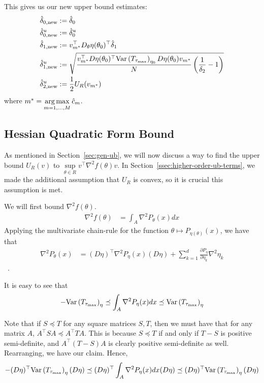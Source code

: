 \documentclass[10pt]{article}
\newcommand{\new}{\operatorname{new}}
\begin{document}
This gives us our new upper bound estimates:
\begin{align*}
    \hat{\delta}_{0, \new} &:= \hat{\delta}_0 \\
    \hat{\delta}_{0, \new}^u &:= \hat{\delta}_0^u \\
    \hat{\delta}_{1, \new} &:= v_{m^*}^\top D_\theta \eta(\theta_0)^\top \hat{\delta}_1 \\
    \hat{\delta}_{1, \new}^u &:= \sqrt{%
        \frac{v_{m^*}^\top D\eta(\theta_0)^\top \var{T_{\tau_{\max}}}_{\eta_0} D\eta(\theta_0) v_{m^*}}{N} 
        \paren{\frac{1}{\delta_2}-1}
    } \\
    \hat{\delta}_{2, \new}^u &:= 
    \frac{1}{2} U_R(v_{m^*})
\end{align*}
where $m^* = \operatorname*{arg\,max}\limits_{m=1,\ldots, M} \hat{c}_m$.


\subsection{Hessian Quadratic Form Bound}\label{ssec:hess-quadform-bound}

As mentioned in Section~\ref{sec:gen-ub}, 
we will now discuss a way to find the upper bound $U_R(v)$ to
$\sup\limits_{\theta \in R} v^\top \nabla^2 f(\theta) v$.
In Section~\ref{ssec:higher-order-ub-terms},
we made the additional assumption that $U_R$ is convex,
so it is crucial this assumption is met.

We will first bound $\nabla^2 f(\theta)$.
\begin{align*}
    \nabla^2 f(\theta)
    &=
    \int_A \nabla^2 P_\theta(x) dx
\end{align*}
Applying the multivariate chain-rule for the function
$\theta \mapsto P_{\eta(\theta)}(x)$,
we have that
\begin{align*}
    \nabla^2 P_\theta(x)
    &=
    (D\eta)^\top \nabla^2 P_\eta(x) (D\eta)
    + 
    \sum\limits_{k=1}^d 
    \frac{\partial P_\eta}{\partial \eta_k}
    \nabla^2 \eta_k
\end{align*}
~\cite{skorski:2019:hess}.

It is easy to see that
\begin{align*}
    -\text{Var}\left(T_{\tau_{\max}}\right)_{\eta}
    \preceq
    \int_A \nabla^2 P_{\eta}(x) dx
    \preceq
    \text{Var}\left(T_{\tau_{\max}}\right)_{\eta}
\end{align*}

Note that if $S \preceq T$
for any square matrices $S, T$,
then we must have that for any matrix $A$,
$A^\top S A \preceq A^\top T A$.
This is because $S \preceq T$
if and only if $T - S$ is positive semi-definite,
and $A^\top (T-S) A$ is clearly positive semi-definite as well.
Rearranging, we have our claim.
Hence, 
\begin{align*}
    -(D\eta)^\top
    \text{Var}\left(T_{\tau_{\max}}\right)_{\eta}
    (D\eta)
    \preceq
    (D\eta)^\top
    \int_A \nabla^2 P_{\eta}(x) dx
    (D\eta)
    \preceq
    (D\eta)^\top
    \text{Var}\left(T_{\tau_{\max}}\right)_{\eta}
    (D\eta)
\end{align*}
\end{document}
